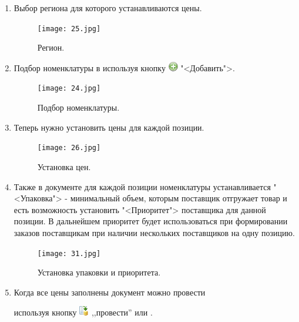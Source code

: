 \begin{itemize}
\begin{enumerate}
		\item Выбор региона для которого устанавливаются цены.
		\begin{figure}[H]
			\texttt{[image: 25.jpg]}
			\caption{Регион.}
			\label{ris:25.jpg}
		\end{figure}		
		\item Подбор номенклатуры в используя кнопку \includegraphics[width=0.02\linewidth]{images/new}  "<Добавить">.
		\begin{figure}[H]
			\texttt{[image: 24.jpg]}
			\caption{Подбор номенклатуры.}
			\label{ris:24.jpg}
		\end{figure}		
		\item Теперь нужно установить цены для каждой позиции.
		 \begin{figure}[H]
		 	\texttt{[image: 26.jpg]}
		 	\caption{Установка цен.}
		 	\label{ris:26.jpg}
		 \end{figure}		
		\item Также в документе для каждой позиции номенклатуры устанавливается "<Упаковка"> - минимальный объем, которым поставщик отгружает товар и есть возможность установить "<Приоритет"> поставщика для данной позиции. В дальнейшем приоритет будет использоваться при формировании заказов поставщикам при наличии нескольких поставщиков на одну позицию.
		\begin{figure}[H]
			\texttt{[image: 31.jpg]}
			\caption{Установка упаковки и приоритета.}
			\label{ris:31.jpg}
		\end{figure}			 
	 
 		\item Когда все цены заполнены документ можно провести \par используя кнопку \includegraphics[width=0.02\linewidth]{images/pr} ,,провести'' или .
	\end{enumerate}	
	

\end{itemize}
